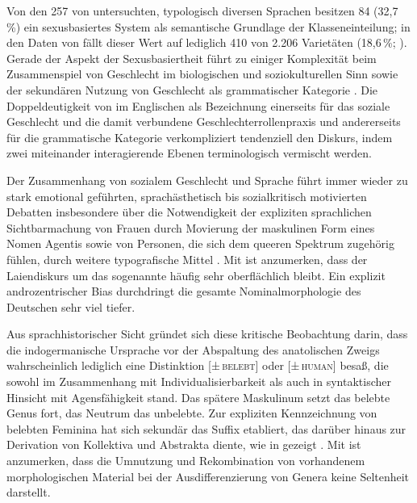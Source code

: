 Von den 257 von \citet{corbett2013b} untersuchten, typologisch diversen
Sprachen besitzen 84 (32,7\,\%) ein sexusbasiertes System als semantische
Grundlage der Klasseneinteilung; in den Daten von 
\autocite{skirgardetal2023} fällt dieser Wert auf lediglich 410 von 2.206
Varietäten (18,6\,\%; \cite[siehe][]{haynie:gb051}). Gerade der Aspekt der
Sexusbasiertheit führt zu einiger Komplexität beim Zusammenspiel von Geschlecht
im biologischen und soziokulturellen Sinn sowie der sekundären Nutzung von
Geschlecht als grammatischer Kategorie \autocites[dazu
ausführlich][]{kotthoffnuebling2018}{steriopolosteriopolo2022}. Die
Doppeldeutigkeit von  im Englischen als Bezeichnung
einerseits für das soziale Geschlecht und die damit verbundene
Geschlechter\-rollen\-praxis und andererseits für die grammatische Kategorie
verkompliziert tendenziell den Diskurs, indem zwei miteinander interagierende
Ebenen terminologisch vermischt werden.

Der Zusammenhang von sozialem Geschlecht und Sprache führt immer wieder zu
stark emotional geführten, sprachästhetisch bis sozialkritisch motivierten
Debatten insbesondere über die Notwendigkeit der expliziten sprachlichen
Sichtbarmachung von Frauen durch Movierung der maskulinen Form eines Nomen
Agentis sowie von Personen, die sich dem queeren Spektrum zugehörig fühlen,
durch weitere typografische Mittel \autocite[dazu kritisch
resümierend][]{kasper2022}. Mit \citet[61--89]{kotthoffnuebling2018} ist
anzumerken, dass der Laiendiskurs um das sogenannte  häufig sehr
oberflächlich bleibt. Ein explizit andro\-zentrischer Bias durchdringt die
gesamte Nominalmorphologie des Deutschen sehr viel tiefer.

Aus sprachhistorischer Sicht gründet sich diese kritische Beobachtung darin,
dass die indogermanische Ursprache vor der Abspaltung des
anatolischen Zweigs wahrscheinlich lediglich eine Distinktion
\textsc{[±\,belebt]} oder \textsc{[±\,human]} besaß, die sowohl im Zusammenhang
mit Individualisierbarkeit als auch in syntaktischer Hinsicht mit
Agensfähigkeit stand. Das spätere Maskulinum setzt das belebte Genus fort, das
Neutrum das unbelebte. Zur expliziten Kennzeichnung von belebten Feminina hat
sich sekundär das Suffix  etabliert, das darüber hinaus zur Derivation
von Kollektiva und Abstrakta diente, wie in  gezeigt
\autocites%
	[73--74, 77]{ringe2017}%
	[195--197, 205--207]{fritzmeierbruegger2021}%
	[167--172]{klein2022}%
. Mit \citet[313]{corbett1991} ist anzumerken, dass die Umnutzung und
Rekombination von vorhandenem morphologischen Material bei der
Ausdifferenzierung von Genera keine Seltenheit darstellt.

